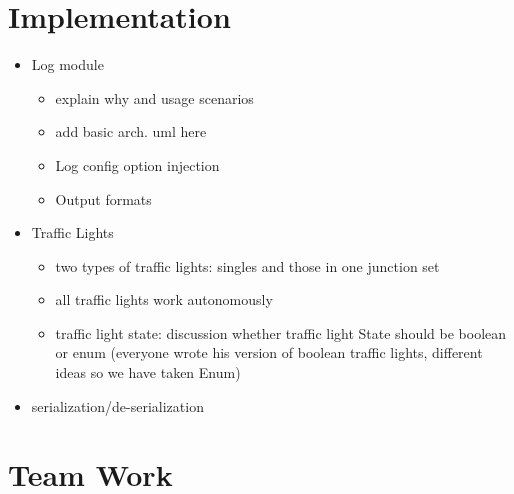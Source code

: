 \section{Implementation}
\begin{itemize}
    \item Log module
    \begin{itemize}
        \item explain why and usage scenarios
        \item add basic arch. uml here
        \item Log config option injection
        \item Output formats
    \end{itemize}

    \item Traffic Lights
    \begin{itemize}
        \item two types of traffic lights: singles and those in one junction set
        \item all traffic lights work autonomously
        \item traffic light state: discussion whether traffic light State should be boolean or enum (everyone wrote his version of boolean traffic lights, different ideas so we have taken Enum)
    \end{itemize}
\end{itemize}

\begin{itemize}
	\item serialization/de-serialization
\end{itemize}


\section{Team Work}

